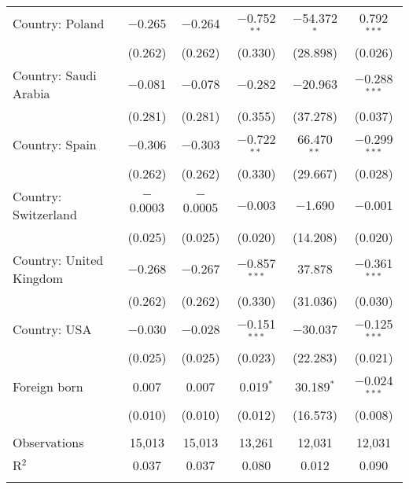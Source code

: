 \begin{tabular}{@{\extracolsep{5pt}}lccccc}
  Country: Poland & $-$0.265 & $-$0.264 & $-$0.752$^{**}$ & $-$54.372$^{*}$ & 0.792$^{***}$ \\ 
  & (0.262) & (0.262) & (0.330) & (28.898) & (0.026) \\ 
  Country: Saudi Arabia & $-$0.081 & $-$0.078 & $-$0.282 & $-$20.963 & $-$0.288$^{***}$ \\ 
  & (0.281) & (0.281) & (0.355) & (37.278) & (0.037) \\ 
  Country: Spain & $-$0.306 & $-$0.303 & $-$0.722$^{**}$ & 66.470$^{**}$ & $-$0.299$^{***}$ \\ 
  & (0.262) & (0.262) & (0.330) & (29.667) & (0.028) \\ 
  Country: Switzerland & $-$0.0003 & $-$0.0005 & $-$0.003 & $-$1.690 & $-$0.001 \\ 
  & (0.025) & (0.025) & (0.020) & (14.208) & (0.020) \\ 
  Country: United Kingdom & $-$0.268 & $-$0.267 & $-$0.857$^{***}$ & 37.878 & $-$0.361$^{***}$ \\ 
  & (0.262) & (0.262) & (0.330) & (31.036) & (0.030) \\ 
  Country: USA & $-$0.030 & $-$0.028 & $-$0.151$^{***}$ & $-$30.037 & $-$0.125$^{***}$ \\ 
  & (0.025) & (0.025) & (0.023) & (22.283) & (0.021) \\ 
  Foreign born & 0.007 & 0.007 & 0.019$^{*}$ & 30.189$^{*}$ & $-$0.024$^{***}$ \\ 
  & (0.010) & (0.010) & (0.012) & (16.573) & (0.008) \\ 
 \hline \\[-1.8ex] 

Observations & 15,013 & 15,013 & 13,261 & 12,031 & 12,031 \\ 
R$^{2}$ & 0.037 & 0.037 & 0.080 & 0.012 & 0.090 \\ 
\hline 
\hline \\[-1.8ex] 
\end{tabular} 